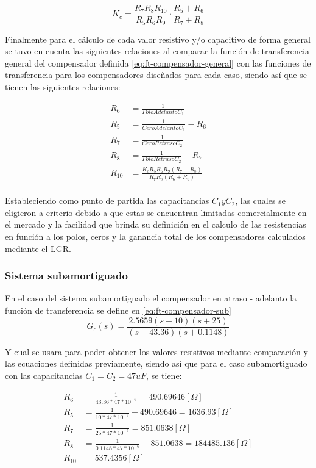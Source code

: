 \documentclass[conference]{IEEEtran}
\begin{document}
	 \begin{equation}
	 	K_c = \frac{R_7 R_8 R_{10}}{R_5 R_6 R_9} \cdot \frac{R_5 + R_6}{R_7 + R_8}
	 	\label{eq:ganancia-compensador}
	 \end{equation}
	 
	 Finalmente para el cálculo de cada valor resistivo y/o capacitivo de forma general se tuvo en cuenta las siguientes relaciones al comparar la función de transferencia general del compensador definida \ref{eq:ft-compensador-general} con las funciones de transferencia para los compensadores diseñados para cada caso, siendo así que se tienen las siguientes relaciones:
	 
	 \begin{align}
	 	R_6 &= \frac{1}{PoloAdelantoC_1} \\
	 	R_5 &= \frac{1}{CeroAdelantoC_1} - R_6 \\
	 	R_7 &= \frac{1}{CeroRetrasoC_2} \\
	 	R_8 &= \frac{1}{PoloRetrasoC_2} - R_7 \\
	 	R_10 &= \frac{K_cR_5 R_6 R_9 (R_7 + R_8)}{R_7 R_8(R_6 + R_5)} \\
	 \end{align}
	 
	 Estableciendo como punto de partida las capacitancias $C_1 y C_2$, las cuales se eligieron a criterio debido a que estas se encuentran limitadas comercialmente en el mercado y la facilidad que brinda su definición en el calculo de las resistencias en función a los polos, ceros y la ganancia total de los compensadores calculados mediante el LGR.
	 
	 \subsubsection{\textbf{Sistema subamortiguado}}
	 En el caso del sistema subamortiguado el compensador en atraso - adelanto la función de transferencia se define en \ref{eq:ft-compensador-sub}
	 \begin{equation}
	 	G_c(s) = \frac{2.5659(s + 10)(s + 25)}{(s + 43.36)(s + 0.1148)}
	 	\label{eq:ft-compensador-sub}
	 \end{equation}
	 
	 Y cual se usara para poder obtener los valores resistivos mediante comparación y las ecuaciones definidas previamente, siendo así que para el caso subamortiguado con las capacitancias $C_1 = C_2 = 47uF$, se tiene:
	 
	 \begin{align}
	 	R_6 &= \frac{1}{43.36*47*10^{-6}} = 490.69646 [\Omega] \\
	 	R_5 &= \frac{1}{10*47*10^{-6}} - 490.69646 = 1636.93 [\Omega] \\
	 	R_7 &= \frac{1}{25*47*10^{-6}} = 851.0638 [\Omega] \\
	 	R_8 &= \frac{1}{0.1148*47*10^{-6}} - 851.0638 = 184485.136 [\Omega] \\
	 	R_{10} &= 537.4356 [\Omega] \\
	 \end{align}
	 
\end{document}
